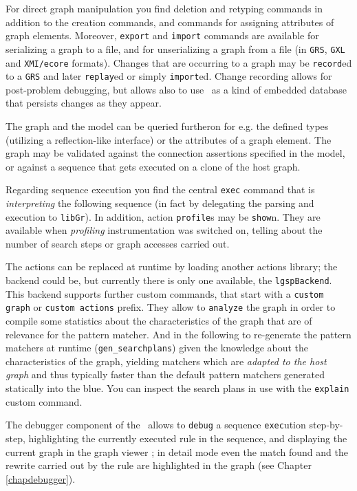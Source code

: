 For direct graph manipulation you find deletion and retyping commands in addition to the creation commands, and commands for assigning attributes of graph elements.
Moreover, \texttt{export} and \texttt{import} commands are available for serializing a graph to a file, and for unserializing a graph from a file (in \texttt{GRS}, \texttt{GXL} and \texttt{XMI/ecore} formats). 
Changes that are occurring to a graph may be \texttt{record}ed to a \texttt{GRS} and later \texttt{replay}ed or simply \texttt{import}ed.
Change recording allows for post-problem debugging, but allows also to use \GrG\ as a kind of embedded database that persists changes as they appear. %

The graph and the model can be queried furtheron for e.g. the defined types (utilizing a reflection-like interface) or the attributes of a graph element.
The graph may be validated against the connection assertions specified in the model, or against a sequence that gets executed on a clone of the host graph.

Regarding sequence execution you find the central \texttt{exec} command that is \emph{interpreting} the following sequence (in fact by delegating the parsing and execution to \texttt{libGr}).
In addition, action \texttt{profile}s may be \texttt{show}n. They are available when \emph{profiling} instrumentation was switched on, telling about the number of search steps or graph accesses carried out.

The actions can be replaced at runtime by loading another actions library; the backend could be, but currently there is only one available, the \texttt{lgspBackend}.
This backend supports further custom commands, that start with a \texttt{custom graph} or \texttt{custom actions} prefix. 
They allow to \texttt{analyze} the graph in order to compile some statistics about the characteristics of the graph that are of relevance for the pattern matcher.
And in the following to re-generate the pattern matchers at runtime (\texttt{gen\_searchplans}) given the knowledge about the characteristics of the graph, yielding matchers which are \emph{adapted to the host graph} and thus typically faster than the default pattern matchers generated statically into the blue.
You can inspect the search plans in use with the \texttt{explain} custom command.

The debugger component of the \GrShell\ allows to \texttt{debug} a sequence \texttt{exec}ution step-by-step, highlighting the currently executed rule in the sequence, and displaying the current graph in the graph viewer \yComp;
in detail mode even the match found and the rewrite carried out by the rule are highlighted in the graph (see Chapter \ref{chapdebugger}).

